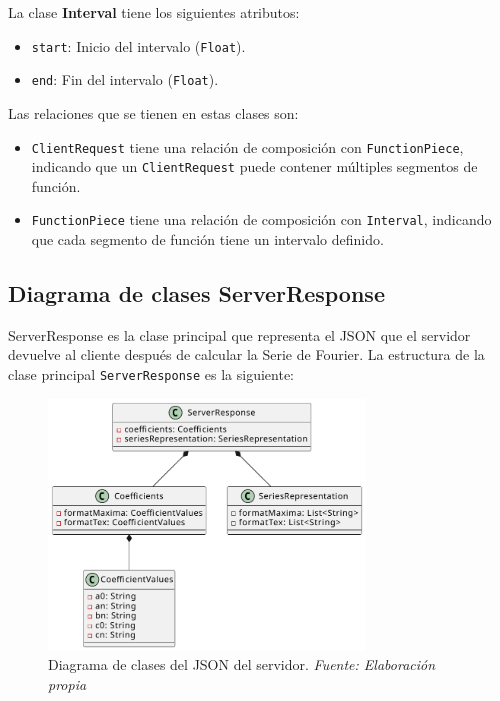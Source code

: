 	
La clase  \textbf{Interval} tiene los siguientes atributos:
\begin{itemize}
	\item \texttt{start}: Inicio del intervalo (\texttt{Float}).
	\item \texttt{end}: Fin del intervalo (\texttt{Float}).
\end{itemize}

Las relaciones que se tienen en estas clases son:
\begin{itemize}
	\item \texttt{ClientRequest} tiene una relación de composición con \texttt{FunctionPiece}, indicando que un \texttt{ClientRequest} puede contener múltiples segmentos de función.
	\item \texttt{FunctionPiece} tiene una relación de composición con \texttt{Interval}, indicando que cada segmento de función tiene un intervalo definido.
\end{itemize}



\subsection{Diagrama de clases ServerResponse}
ServerResponse es la clase principal que representa el JSON que el servidor devuelve al cliente después de calcular la Serie de Fourier. \newline
La estructura de la clase principal \texttt{ServerResponse} es la siguiente:
\begin{figure}[H]
	\centering
	\includegraphics[width=0.75\textwidth]{img/chapter04/DC_JSON_Server.pdf}
	\caption[Diagrama de clases del JSON del servidor.]{Diagrama de clases del JSON del servidor. \textit{Fuente: \textit{Elaboración propia}}}
	\label{fig:Diagrama_clase_servidor}
\end{figure}

